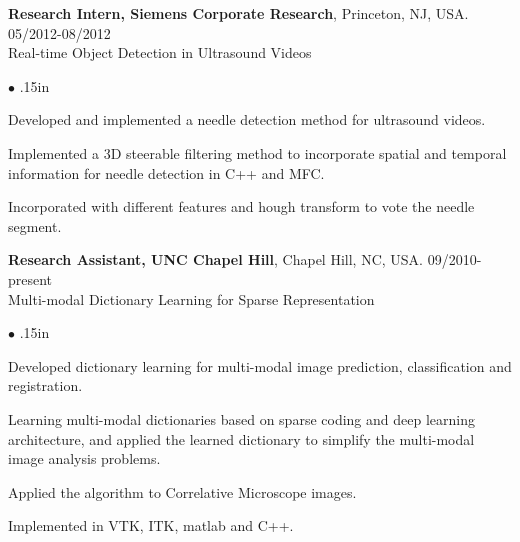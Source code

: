 \documentclass[line,margin]{res}
\newenvironment{bullets}{\begin{list}{\tiny$\bullet$}{\topsep 0pt \itemsep -2pt \leftmargin .15in}}{\vspace*{4pt}\end{list}}
\begin{document}
\begin{resume}
\textbf{Research Intern, Siemens Corporate Research}, Princeton, NJ, USA. \hfill      05/2012-08/2012 \\
Real-time Object Detection in Ultrasound Videos
\begin{bullets} 
\item Developed and implemented a needle detection method for ultrasound videos. 
\item Implemented a 3D steerable filtering method to incorporate spatial and temporal information for needle detection in C++ and MFC.
\item Incorporated with different features and hough transform to vote the needle segment.
\end{bullets}
\vspace{-.1in}

\textbf{Research Assistant, UNC Chapel Hill}, Chapel Hill, NC, USA.  \hfill      09/2010-present \\
Multi-modal Dictionary Learning for Sparse Representation %
\begin{bullets}
\item Developed dictionary learning for multi-modal image prediction, classification and registration.
\item Learning multi-modal dictionaries based on sparse coding and deep learning architecture, and applied the learned dictionary to simplify the multi-modal image analysis problems.
\item Applied the algorithm to Correlative Microscope images.
\item Implemented in VTK, ITK, matlab and C++.
\end{bullets}
\vspace{-.1in}


\end{resume}
\end{document}
